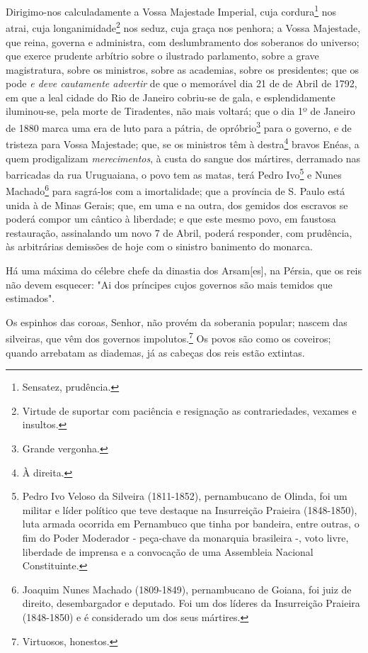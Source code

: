{Dirigimo-nos calculadamente a Vossa Majestade Imperial, cuja
cordura\footnote{Sensatez, prudência.} nos atrai, cuja
longanimidade\footnote{Virtude de suportar com paciência e resignação
  as contrariedades, vexames e insultos.} nos seduz, cuja graça nos
penhora; a Vossa Majestade, que reina, governa e administra, com
deslumbramento dos soberanos do universo; que exerce prudente arbítrio
sobre o ilustrado parlamento, sobre a grave magistratura, sobre os
ministros, sobre as academias, sobre os presidentes; que os pode \emph{e
deve cautamente advertir} de que o memorável dia 21 de de Abril de 1792,
em que a leal cidade do Rio de Janeiro cobriu-se de gala, e
esplendidamente iluminou-se, pela morte de Tiradentes, não mais voltará;
que o dia 1º de Janeiro de 1880 marca uma era de luto para a pátria, de
opróbrio\footnote{Grande vergonha.} para o governo, e de tristeza para
Vossa Majestade; que, se os ministros têm à destra\footnote{À direita.}
bravos Enéas, a quem prodigalizam \emph{merecimentos}, à custa do sangue
dos mártires, derramado nas barricadas da rua Uruguaiana, o povo tem as
matas, terá Pedro Ivo\footnote{Pedro Ivo Veloso da Silveira
  (1811-1852), pernambucano de Olinda, foi um militar e líder político
  que teve destaque na Insurreição Praieira (1848-1850), luta armada
  ocorrida em Pernambuco que tinha por bandeira, entre outras, o fim do
  Poder Moderador - peça-chave da monarquia brasileira -, voto livre,
  liberdade de imprensa e a convocação de uma Assembleia Nacional
  Constituinte.} e Nunes Machado\footnote{Joaquim Nunes Machado
  (1809-1849), pernambucano de Goiana, foi juiz de direito,
  desembargador e deputado. Foi um dos líderes da Insurreição Praieira
  (1848-1850) e é considerado um dos seus mártires.} para sagrá-los com
a imortalidade; que a província de S. Paulo está unida à de Minas
Gerais; que, em uma e na outra, dos gemidos dos escravos se poderá
compor um cântico à liberdade; e que este mesmo povo, em faustosa
restauração, assinalando um novo 7 de Abril, poderá responder, com
prudência, às arbitrárias demissões de hoje com o sinistro banimento do
monarca.

Há uma máxima do célebre chefe da dinastia dos Arsam{[}es{]}, na Pérsia,
que os reis não devem esquecer: "Ai dos príncipes cujos governos são
mais temidos que estimados".

Os espinhos das coroas, Senhor, não provém da soberania popular; nascem
das silveiras, que vêm dos governos impolutos.\footnote{Virtuosos,
  honestos.} Os povos são como os coveiros; quando arrebatam as
diademas, já as cabeças dos reis estão extintas.

}
